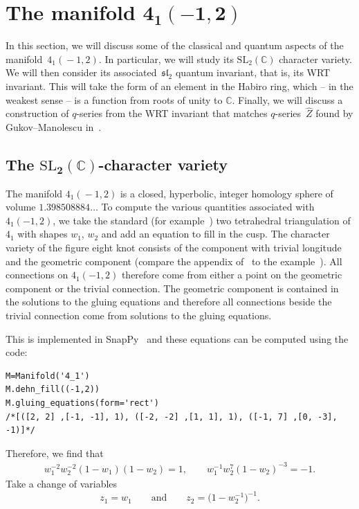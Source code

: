 \documentclass[pdftex]{sigma}
\numberwithin{equation}{section}
\def\BC{\mathbb{C}}
\def\SL{\mathrm{SL}}
\def\SL{\mathrm{SL}}
\def\BC{\mathbb C}
\def\SL{\mathrm{SL}}
\begin{document}
\section[The manifold $4_1(-1,2)$]{The manifold $\boldsymbol{4_1(-1,2)}$}

In this section, we will discuss some of the classical and quantum aspects of the manifold~$4_1(\!-1,2)$. In particular, we will study its $\SL_{2}(\BC)$ character variety. We will then consider its associated~$\mathfrak{sl}_2$ quantum invariant, that is, its WRT invariant. This will take the form of an element in the Habiro ring, which -- in the weakest sense -- is a function from roots of unity to $\mathbb{C}$. Finally, we will discuss a construction of $q$-series from the WRT invariant that matches $q$-series~$\widehat{Z}$ found by Gukov--Manolescu in~\cite{GukovMan}.

\subsection[The $\SL_{2}(\BC)$-character variety]{The $\boldsymbol{\SL_{2}(\BC)}$-character variety}

The manifold $4_1(\!-1,2)$ is a closed, hyperbolic, integer homology sphere of volume $1.398508884\dots$ To compute the various quantities associated with $4_1(-1,2)$, we take the standard (for example~\cite{Thurston:GT3M}) two tetrahedral triangulation of $4_1$ with shapes $w_1$, $w_2$ and add an equation to fill in the cusp. The character variety of the figure eight knot consists of the component with trivial longitude and the geometric component (compare the appendix of~\cite{CCGLS} to the example~\cite[equation~(4.20)]{DimGar:QC}). All connections on $4_1(-1,2)$ therefore come from either a point on the geometric component or the trivial connection. The geometric component is contained in the solutions to the gluing equations and therefore all connections beside the trivial connection come from solutions to the gluing equations.



This is implemented in SnapPy~\cite{SnapPy} and these equations can be computed using the code:
\begin{lstlisting}
M=Manifold('4_1')
M.dehn_fill((-1,2))
M.gluing_equations(form='rect')
/*[([2, 2] ,[-1, -1], 1), ([-2, -2] ,[1, 1], 1), ([-1, 7] ,[0, -3], -1)]*/
\end{lstlisting}
Therefore, we find that
\begin{align*}
 w_1^{-2}w_2^{-2}(1-w_1)(1-w_2) =1,\qquad
 w_1^{-1}w_2^7(1-w_2)^{-3} =-1 .
\end{align*}
Take a change of variables
\[
 z_{1} =w_{1}
 \qquad\text{and}\qquad
 z_{2} =\bigl(1-w_2^{-1}\bigr)^{-1} .
\]
\end{document}
